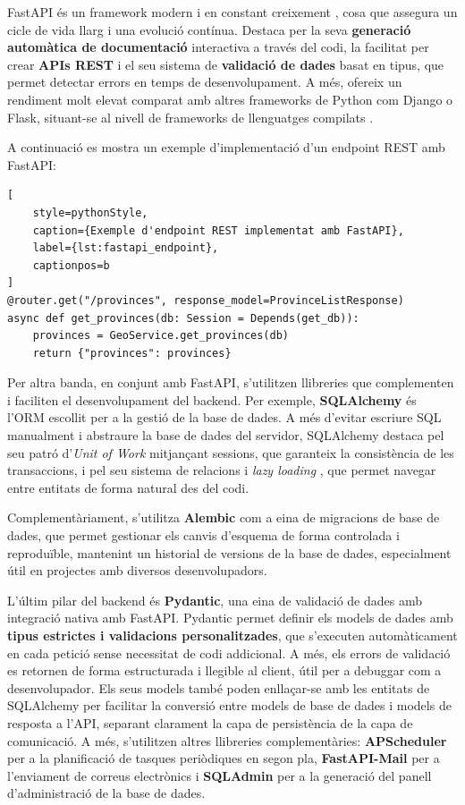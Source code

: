 \documentclass[11pt,a4paper]{report}
\begin{document}
FastAPI és un framework modern i en constant creixement \cite{noauthor_fastapi_nodate}, cosa que assegura un cicle de vida llarg i una evolució contínua. Destaca per la seva \textbf{generació automàtica de documentació} interactiva a través del codi, la facilitat per crear \textbf{APIs REST} i el seu sistema de \textbf{validació de dades} basat en tipus, que permet detectar errors en temps de desenvolupament. A més, ofereix un rendiment molt elevat comparat amb altres frameworks de Python com Django o Flask, situant-se al nivell de frameworks de llenguatges compilats \cite{noauthor_benchmarks_nodate}.

A continuació es mostra un exemple d’implementació d’un endpoint REST amb FastAPI:

\begin{lstlisting}[
    style=pythonStyle,
    caption={Exemple d'endpoint REST implementat amb FastAPI},
    label={lst:fastapi_endpoint},
    captionpos=b
]
@router.get("/provinces", response_model=ProvinceListResponse)
async def get_provinces(db: Session = Depends(get_db)):
    provinces = GeoService.get_provinces(db)
    return {"provinces": provinces}
\end{lstlisting}
Per altra banda, en conjunt amb FastAPI, s'utilitzen llibreries que complementen i faciliten el desenvolupament del backend. Per exemple, \textbf{SQLAlchemy} és l'ORM escollit per a la gestió de la base de dades. A més d'evitar escriure SQL manualment i abstraure la base de dades del servidor, SQLAlchemy destaca pel seu patró d'\textit{Unit of Work} \cite{noauthor_session_nodate} mitjançant sessions, que garanteix la consistència de les transaccions, i pel seu sistema de relacions i \textit{lazy loading} \cite{noauthor_relationship_nodate}, que permet navegar entre entitats de forma natural des del codi.

Complementàriament, s'utilitza \textbf{Alembic} com a eina de migracions de base de dades, que permet gestionar els canvis d'esquema de forma controlada i reproduïble, mantenint un historial de versions de la base de dades, especialment útil en projectes amb diversos desenvolupadors.

L'últim pilar del backend és \textbf{Pydantic}, una eina de validació de dades amb integració nativa amb FastAPI. Pydantic permet definir els models de dades amb \textbf{tipus estrictes i validacions personalitzades}, que s'executen automàticament en cada petició sense necessitat de codi addicional. A més, els errors de validació es retornen de forma estructurada i llegible al client, útil per a debuggar com a desenvolupador. Els seus models també poden enllaçar-se amb les entitats de SQLAlchemy per facilitar la conversió entre models de base de dades i models de resposta a l'API, separant clarament la capa de persistència de la capa de comunicació.
A més, s'utilitzen altres llibreries complementàries: \textbf{APScheduler} \cite{noauthor_advanced_nodate} per a la planificació de tasques periòdiques en segon pla, \textbf{FastAPI-Mail} \cite{sabuhi_sabuhishfastapi-mail_2026} per a l'enviament de correus electrònics i \textbf{SQLAdmin} \cite{noauthor_smithyhqsqladmin_2026} per a la generació del panell d'administració de la base de dades.
\end{document}
